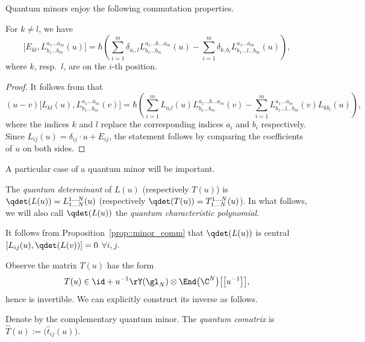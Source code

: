 	Quantum minors enjoy the following commutation properties.
	\begin{Proposition}
		\label{prop::minor_comm}
		For $k\neq l$, we have
		\begin{equation*}
			\bigl[E_{kl}, L_{b_1\dots b_m}^{a_1 \dots a_m}(u)\bigr] = \hbar \left(\sum\limits_{i=1}^m \delta_{a_i,l} L_{b_1\dots b_m}^{a_1\dots k \dots a_m}(u) - \sum\limits_{i=1}^m \delta_{k,b_i} L_{b_1\dots l \dots b_m}^{a_1\dots a_m}(u)\right),
		\end{equation*}
		where $k$, resp.\ $l$, are on the $i$-th position.
		\begin{proof}
			It follows from \cite[Proposition 1.7.1]{MolevYangians} that
			\begin{equation*}
				(u-v) \bigl[L_{kl}(u), L_{b_1 \dots b_m}^{a_1 \dots a_m}(v)\bigr] =\hbar \left( \sum\limits_{i=1}^m L_{a_i l}(u) L_{b_1 \dots b_m}^{a_1 \dots k \dots a_m}(v) - \sum\limits_{i=1}^{m} L_{b_1 \dots l \dots b_m}^{a_1 \dots a_m}(v) L_{k b_i}(u) \right),
			\end{equation*}
			where the indices $k$ and $l$ replace the corresponding indices $a_i$ and $b_i$ respectively. Since $L_{ij}(u) = \delta_{ij} \cdot u + E_{ij}$, the statement follows by comparing the coefficients of $u$ on both sides.
		\end{proof}
	\end{Proposition}
	
	A particular case of a quantum minor will be important.
	
	\begin{Definition}
		\label{def::qdet}
		The \emph{quantum determinant} of $L(u)$ (respectively $T(u)$) is
$
		\qdet(L(u)) = L_{1\dots N}^{1\dots N}(u)
$
		\big(respectively $\qdet(T(u)) = T_{1\dots N}^{1\dots N}(u)$\big). In what follows, we will also call $\qdet(L(u))$ the \emph{quantum characteristic polynomial}.
	\end{Definition}
	
	It follows from Proposition~\ref{prop::minor_comm} that $\qdet(L(u))$ is central
$
	[L_{ij}(u), \qdet(L(v))] = 0$  $\forall i,j$.
	
	Observe the matrix $T(u)$ has the form
	\[
	T(u) \in \id + u^{-1} \rY(\gl_N) \otimes \End\bigl(\C^N\bigr)\bigl[\bigl[u^{-1}\bigr]\bigr],
	\]
	hence is invertible. We can explicitly construct its inverse as follows.
	\begin{Definition}
		Denote by  the complementary quantum minor. The \emph{quantum comatrix} is $
		\hat{T}(u) := \bigl(\hat{t}_{ij}(u)\bigr)$.
	\end{Definition}
	
